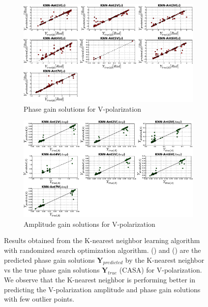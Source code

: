 \begin{figure}[H]
   \centering
    \begin{subfigure}[t]{0.52\textheight}
        
        \includegraphics[width=\textwidth]{images/KNNVphase.eps} 
        \caption{Phase gain solutions for V-polarization} \label{A5}
    \end{subfigure}
    
      \begin{subfigure}[t]{0.52\textheight}
       
        \includegraphics[width=\textwidth]{images/KNNVamp.eps} 
        \caption{Amplitude gain solutions for V-polarization} \label{B5}
    \end{subfigure}
    \caption{Results obtained from the K-nearest neighbor learning algorithm with randomized search optimization algorithm. () and () are the predicted phase gain solutions $\textbf{Y}_{predicted}$ by the K-nearest neighbor vs the true phase gain solutions $\textbf{Y}_{true}$ (CASA) for V-polarization. We observe that the K-nearest neighbor is performing better in predicting the V-polarization amplitude and phase gain solutions with few outlier points. }
    \label{BBB4}
    \end{figure} 
   

